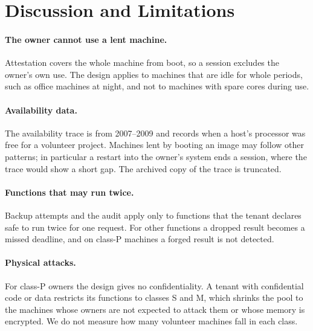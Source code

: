 \section{Discussion and Limitations}
\label{sec:discussion}


\paragraph{The owner cannot use a lent machine.} Attestation covers the whole machine from boot, so a session
excludes the owner's own use. The design applies to machines that are idle for whole periods, such as office machines
at night, and not to machines with spare cores during use.

\paragraph{Availability data.} The availability trace is from 2007--2009 and records when a host's processor was free
for a volunteer project. Machines lent by booting an image may follow other patterns; in particular a restart into
the owner's system ends a session, where the trace would show a short gap. The archived copy of the trace is
truncated.

\paragraph{Functions that may run twice.} Backup attempts and the audit apply only to functions that the tenant
declares safe to run twice for one request. For other functions a dropped result becomes a missed deadline, and on
class-P machines a forged result is not detected.

\paragraph{Physical attacks.} For class-P owners the design gives no confidentiality. A tenant with confidential
code or data restricts its functions to classes S and M, which shrinks the pool to the machines whose owners are not
expected to attack them or whose memory is encrypted. We do not measure how many volunteer machines fall in each
class.

